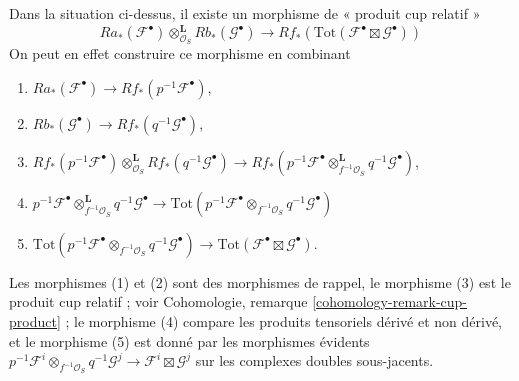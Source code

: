 \medskip\noindent
Dans la situation ci-dessus, il existe un morphisme de « produit cup relatif »
\begin{equation}
\label{equation-relative-de-rham-kunneth}
Ra_*(\mathcal{F}^\bullet)
\otimes_{\mathcal{O}_S}^\mathbf{L}
Rb_*(\mathcal{G}^\bullet)
\longrightarrow
Rf_*\left(\text{Tot}(\mathcal{F}^\bullet \boxtimes \mathcal{G}^\bullet)\right)
\end{equation}
On peut en effet construire ce morphisme en combinant
\begin{enumerate}
\item $Ra_*(\mathcal{F}^\bullet) \to Rf_*(p^{-1}\mathcal{F}^\bullet)$,
\item $Rb_*(\mathcal{G}^\bullet) \to Rf_*(q^{-1}\mathcal{G}^\bullet)$,
\item
$Rf_*(p^{-1}\mathcal{F}^\bullet)
\otimes_{\mathcal{O}_S}^\mathbf{L}
Rf_*(q^{-1}\mathcal{G}^\bullet)
\to
Rf_*(p^{-1}\mathcal{F}^\bullet \otimes_{f^{-1}\mathcal{O}_S}^\mathbf{L}
q^{-1}\mathcal{G}^\bullet)$,
\item
$p^{-1}\mathcal{F}^\bullet \otimes_{f^{-1}\mathcal{O}_S}^\mathbf{L}
q^{-1}\mathcal{G}^\bullet \to
\text{Tot}(p^{-1}\mathcal{F}^\bullet \otimes_{f^{-1}\mathcal{O}_S}
q^{-1}\mathcal{G}^\bullet)$
\item
$\text{Tot}(p^{-1}\mathcal{F}^\bullet \otimes_{f^{-1}\mathcal{O}_S}
q^{-1}\mathcal{G}^\bullet) \to \text{Tot}(\mathcal{F}^\bullet \boxtimes
\mathcal{G}^\bullet)$.
\end{enumerate}
Les morphismes (1) et (2) sont des morphismes de rappel, le morphisme (3) est
le produit cup relatif ; voir
Cohomologie, remarque \ref{cohomology-remark-cup-product} ;
le morphisme (4) compare les produits tensoriels dérivé et non dérivé, et
le morphisme (5) est donné par les morphismes évidents
$p^{-1}\mathcal{F}^i \otimes_{f^{-1}\mathcal{O}_S} q^{-1}\mathcal{G}^j
\to \mathcal{F}^i \boxtimes \mathcal{G}^j$ sur les complexes doubles sous-jacents.

